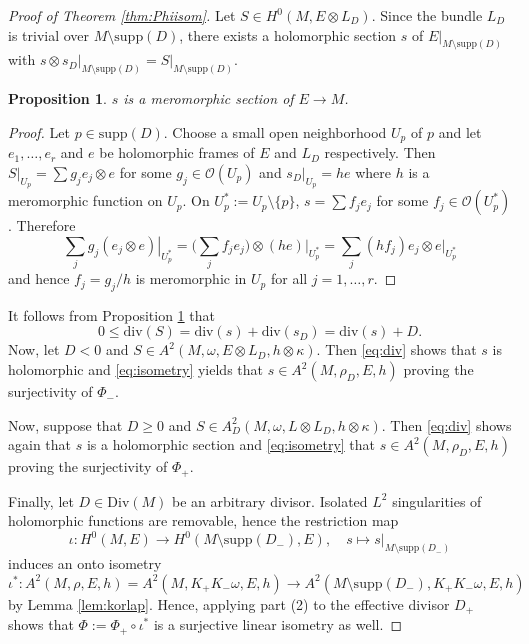 \documentclass[11pt]{amsart}
\newtheorem{prop}[theorem]{Proposition}
\theoremstyle{definition}
\begin{document}
\begin{proof}[Proof of Theorem \ref{thm:Phiisom}]
Let  $S\in H^0(M,E\otimes L_D)$. Since the bundle $L_D$ is trivial over $M\setminus{\text{supp}(D)}$, there exists a holomorphic section $s$ of $\left.E\right|_{M\setminus{\text{supp}(D)}}$ with
$s\otimes\left.s_D\right|_{M\setminus{\text{supp}(D)}}=\left.S\right|_{M\setminus{\text{supp}(D)}}$.
\begin{prop} \label{prop:smerom}
    $s$ is a meromorphic section of $E\rightarrow M$.
\end{prop}
\begin{proof}
 Let $p\in \text{supp}(D)$. Choose a small open neighborhood $U_p$ of $p$ and let $e_1,\dots,e_r$ and $e$ be holomorphic frames of $E$ and $L_D$ respectively. Then $\left.S\right|_{U_p}=\sum g_je_j\otimes e$ for some $g_j\in\mathcal O(U_p)$ and $\left.s_D\right|_{U_p}=he$ where $h$ is a meromorphic function on $U_p$. On $U^*_p:=U_p\setminus\{p\}$, $s=\sum f_je_j$ for some $f_j\in\mathcal O(U^*_p)$.
 Therefore
 $$
\sum_j g_j\left.(e_j\otimes e)\right|_{U^*_p}= \Big(\sum_j f_je_j\Big)\otimes\left.(he)\right|_{U^*_p}=
\sum_j (hf_j)e_j\otimes \left.e\right|_{U^*_p}
 $$
 and hence $f_j=g_j/h$ is meromorphic
 in $U_p$ for all $j=1,\dots, r$.
\end{proof}
\noindent It follows from Proposition \ref{prop:smerom} that
\begin{equation}\label{eq:div}
 0\le\text{div}(S)=\text{div}(s)+\text{div}(s_D)=\text{div}(s)+D.   
\end{equation}
Now, let $D<0$ and $S\in A^2(M,\omega, E\otimes L_D,h\otimes\kappa)$. Then 
\eqref{eq:div} shows that $s$ is holomorphic and \eqref{eq:isometry}  yields that $s\in A^2(M,\rho_D,E,h)$ 
 proving the surjectivity of $\Phi_-$.
 


Now, suppose that $D\geq0$ and 
$S\in A^2_D(M,\omega,L\otimes L_D, h\otimes\kappa)$.
Then \eqref{eq:div} shows again that $s$ is a holomorphic section and \eqref{eq:isometry} that
 $s\in A^2(M,\rho_D,E,h)$ 
 proving the surjectivity of $\Phi_+$.

 Finally, let $D \in \text{Div}(M)$ be an arbitrary divisor.  Isolated $L^2$ singularities of holomorphic functions are removable, hence the restriction map
 $$
 \iota: H^0(M,E)\rightarrow H^0(M\setminus\text{supp} (D_-),E),\quad s\mapsto 
 \left.s\right|_{M\setminus\text{supp}(D_-)}
 $$
 induces an onto isometry
 $$
\iota^*:A^2(M,\rho,E,h)=A^2(M,K_+K_-\omega,E,h)\rightarrow A^2(M\setminus\text{supp}(D_-), K_+K_-\omega, E,h)$$
by Lemma \ref{lem:korlap}. Hence, applying part (2) to the effective divisor $D_+$ shows that $\Phi := \Phi_+ \circ \iota^*$ is a surjective linear isometry as well.
\end{proof}
\end{document}

